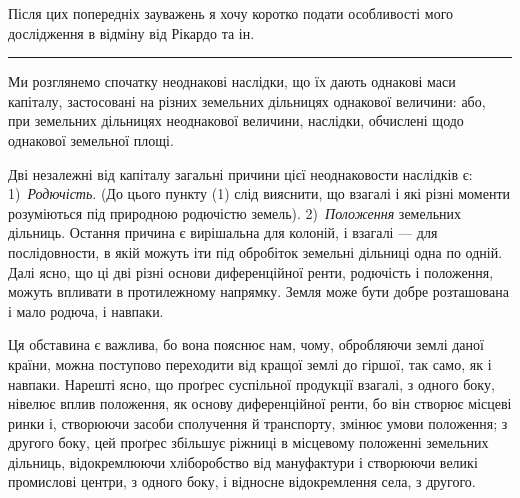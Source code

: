 
Після цих попередніх зауважень я хочу коротко подати особливості мого
дослідження в відміну від Рікардо та ін.

\pfbreak

Ми розглянемо спочатку неоднакові наслідки, що їх дають однакові маси
капіталу, застосовані на різних земельних дільницях однакової величини: або,
при земельних дільницях неоднакової величини, наслідки, обчислені щодо однакової
земельної площі.

Дві незалежні від капіталу загальні причини цієї неоднаковости наслідків
є: 1)~\emph{Родючість}. (До цього пункту (1) слід вияснити, що взагалі і які
різні моменти розуміються під природною родючістю земель). 2)~\emph{Положення}
земельних дільниць. Остання причина є вирішальна для колоній, і взагалі — для
послідовности, в якій можуть іти під обробіток земельні дільниці одна по одній.
Далі ясно, що ці дві різні основи диференційної ренти, родючість і положення,
можуть впливати в протилежному напрямку. Земля може бути добре розташована
і мало родюча, і навпаки.

Ця обставина є важлива, бо вона пояснює нам, чому, обробляючи землі
даної країни, можна поступово переходити від кращої землі до гіршої, так само,
як і навпаки. Нарешті ясно, що проґрес суспільної продукції взагалі, з одного
боку, нівелює вплив положення, як основу диференційної ренти, бо він створює
місцеві ринки і, створюючи засоби сполучення й транспорту, змінює умови
положення; з другого боку, цей проґрес збільшує ріжниці в місцевому положенні
земельних дільниць, відокремлюючи хліборобство від мануфактури і створюючи
великі промислові центри, з одного боку, і відносне відокремлення села, з другого.

